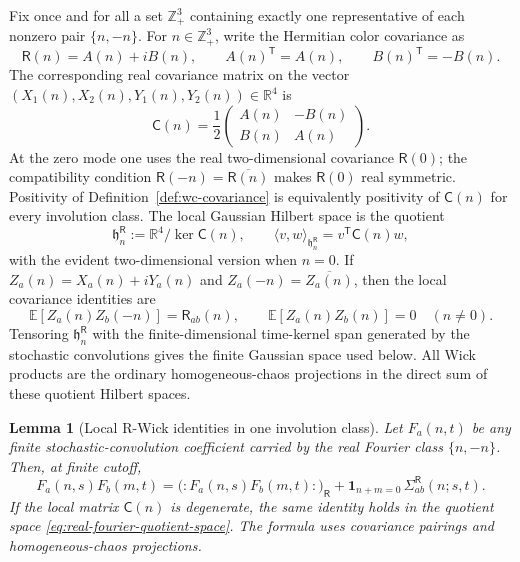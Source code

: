 \documentclass[10pt]{amsart}
\numberwithin{equation}{section}
\theoremstyle{plain}
\newtheorem{lemma}[theorem]{Lemma}
\theoremstyle{definition}
\theoremstyle{remark}
\begin{document}
Fix once and for all a set \(\mathbb Z^3_+\) containing exactly one representative of each nonzero pair \(\{n,-n\}\).  For \(n\in\mathbb Z^3_+\), write the Hermitian color covariance as
\[
        \mathsf R(n)=A(n)+iB(n),
        \qquad A(n)^\mathsf T=A(n),\qquad B(n)^\mathsf T=-B(n).
\]
The corresponding real covariance matrix on the vector
\((X_1(n),X_2(n),Y_1(n),Y_2(n))\in\mathbb R^4\) is
\begin{equation}\label{eq:real-fourier-covariance-matrix}
        \mathsf C(n)=\frac12
        \begin{pmatrix}
        A(n)&-B(n)\\
        B(n)& A(n)
        \end{pmatrix}.
\end{equation}
At the zero mode one uses the real two-dimensional covariance \(\mathsf R(0)\); the compatibility condition \(\mathsf R(-n)=\overline{\mathsf R(n)}\) makes \(\mathsf R(0)\) real symmetric.  Positivity of Definition~\ref{def:wc-covariance} is equivalently positivity of \(\mathsf C(n)\) for every involution class.  The local Gaussian Hilbert space is the quotient
\begin{equation}\label{eq:real-fourier-quotient-space}
        \mathfrak h_n^{\mathsf R}:=\mathbb R^4/\ker\mathsf C(n),
        \qquad
        \langle v,w\rangle_{\mathfrak h_n^{\mathsf R}}=v^\mathsf T\mathsf C(n)w,
\end{equation}
with the evident two-dimensional version when \(n=0\).  If
\(Z_a(n)=X_a(n)+iY_a(n)\) and \(Z_a(-n)=\overline{Z_a(n)}\), then the local covariance identities are
\begin{equation}\label{eq:real-fourier-complex-covariances}
        \mathbb E[Z_a(n)Z_b(-n)]=\mathsf R_{ab}(n),
        \qquad
        \mathbb E[Z_a(n)Z_b(n)]=0
        \quad(n\ne0).
\end{equation}
Tensoring \(\mathfrak h_n^{\mathsf R}\) with the finite-dimensional time-kernel span generated by the stochastic convolutions gives the finite Gaussian space used below.  All Wick products are the ordinary homogeneous-chaos projections in the direct sum of these quotient Hilbert spaces.

\begin{lemma}[Local R-Wick identities in one involution class]
\label{lem:wc-real-fourier-local-wick}
Let \(F_a(n,t)\) be any finite stochastic-convolution coefficient carried by the real Fourier class \(\{n,-n\}\).  Then, at finite cutoff,
\begin{equation}\label{eq:wc-local-wick-identity}
        F_a(n,s)F_b(m,t)
        =\bigl(:F_a(n,s)F_b(m,t):\bigr)_{\mathsf R}
        +\mathbf 1_{n+m=0}\,\Sigma_{ab}^{\mathsf R}(n;s,t).
\end{equation}
If the local matrix \(\mathsf C(n)\) is degenerate, the same identity holds in the quotient space \eqref{eq:real-fourier-quotient-space}.  The formula uses covariance pairings and homogeneous-chaos projections.
\end{lemma}
\end{document}
